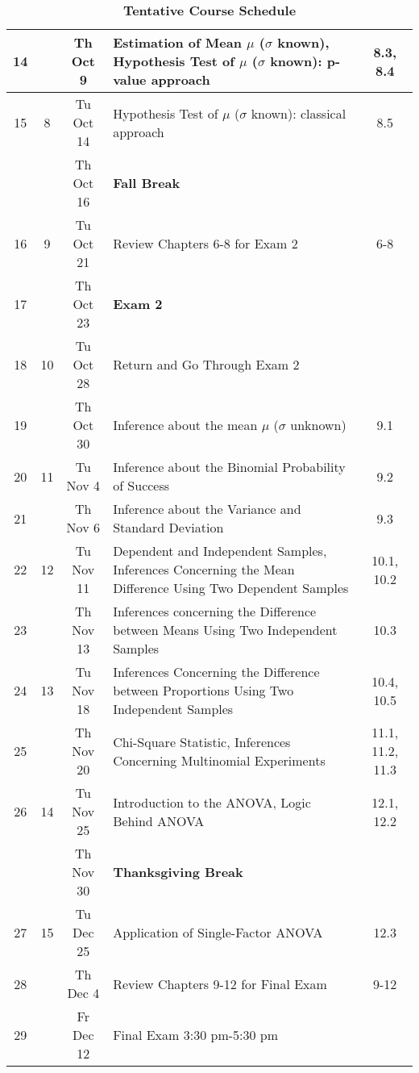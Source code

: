\documentclass[10pt]{article}
\begin{document}
\begin{description}
\begin{table}[]
\begin{tabular}{|c|c|c|p{9cm}|c|}
14 & & Th Oct 9 & Estimation of Mean $\mu$ ($\sigma$ known), Hypothesis Test of $\mu$ ($\sigma$ known): p-value approach & 8.3, 8.4 \\
\hline
15 & 8 & Tu Oct 14 & Hypothesis Test of $\mu$ ($\sigma$ known): classical approach & 8.5 \\
& & Th Oct 16 & \centering\textbf{Fall Break} & \\
\hline
16 & 9 & Tu Oct 21 & Review Chapters 6-8 for Exam 2 & 6-8 \\
17 & &Th Oct 23 & \centering\textbf{Exam 2} & \\
\hline
18 & 10 & Tu Oct 28 & Return and Go Through Exam 2 &  \\
19 & &Th Oct 30 & Inference about the mean $\mu$ ($\sigma$ unknown) & 9.1 \\
\hline
20 & 11 & Tu Nov 4 & Inference about the Binomial Probability of Success & 9.2 \\
21 & &Th Nov 6 & Inference about the Variance and Standard Deviation & 9.3 \\
\hline
22 & 12 & Tu Nov 11 & Dependent and Independent Samples, Inferences Concerning the Mean Difference Using Two Dependent Samples & 10.1, 10.2 \\
23 & &Th Nov 13 & Inferences concerning the Difference between Means Using Two Independent Samples & 10.3 \\
\hline
24 & 13 & Tu Nov 18 & Inferences Concerning the Difference between Proportions Using Two Independent Samples & 10.4, 10.5 \\
25 & & Th Nov 20 & Chi-Square Statistic, Inferences Concerning Multinomial Experiments & 11.1, 11.2, 11.3 \\
\hline
26 & 14 & Tu Nov 25 & Introduction to the ANOVA, Logic Behind ANOVA & 12.1, 12.2 \\
& &Th Nov 30 & \centering\textbf{Thanksgiving Break} & \\
\hline
27 & 15 & Tu Dec 25 & Application of Single-Factor ANOVA & 12.3 \\
28 & &Th Dec 4 & Review Chapters 9-12 for Final Exam & 9-12 \\
\hline
29 & &Fr Dec 12 & Final Exam 3:30 pm-5:30 pm & \\
\hline
\end{tabular}
\caption{\bf{\color{red}Tentative} Course Schedule}

\label{tab:schedule}
\end{table}

\end{description}
\end{document}
